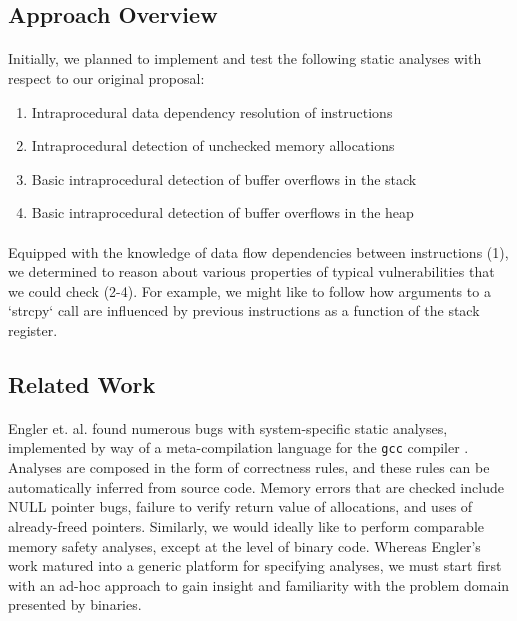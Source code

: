 \documentclass[letterpaper,11pt]{article}
\begin{document}
\subsection{Approach Overview}
\label{approachoverview}

\paragraph{}
Initially, we planned to implement and test the following static
analyses with respect to our original proposal:

\begin{enumerate}
  \item Intraprocedural data dependency resolution of instructions
  \item Intraprocedural detection of unchecked memory allocations
  \item Basic intraprocedural detection of buffer overflows in the stack
  \item Basic intraprocedural detection of buffer overflows in the heap
\end{enumerate}

\paragraph{}
Equipped with the knowledge of data flow dependencies between instructions (1),
we determined to reason about various properties of typical vulnerabilities
that we could check (2-4). For example, we might like to follow how arguments
to a `strcpy` call are influenced by previous instructions as a function of
the stack register.

\subsection{Related Work}

\paragraph{}
Engler et. al. found numerous bugs with system-specific static analyses,
implemented by way of a meta-compilation language for the \texttt{gcc} compiler
\cite{dawson, dawson2}. Analyses are composed in the form of correctness rules,
and these rules can be automatically inferred from source code. Memory errors that are
checked include NULL pointer bugs, failure to verify return value of allocations, and uses of
already-freed pointers. Similarly, we would ideally like to perform comparable
memory safety analyses, except at the level of binary code. Whereas
Engler's work matured into a generic platform for specifying analyses, we must
start first with an ad-hoc approach to gain insight and familiarity with the
problem domain presented by binaries.
\end{document}
